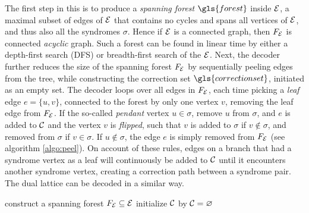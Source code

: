 The first step in this is to produce a \emph{spanning forest} $\gls{forest}$ inside $\mathcal{E}$, a maximal subset of edges of $\mathcal{E}$ that contains no cycles and spans all vertices of $\mathcal{E}$, and thus also all the syndromes $\sigma$. Hence if $\mathcal{E}$ is a connected graph, then $F_{\mathcal{E}}$ is connected \emph{acyclic} graph. Such a forest can be found in linear time by either a depth-first search (DFS) or breadth-first search of the $\mathcal{E}$. Next, the decoder further reduces the size of the spanning forest $F_{\mathcal{E}}$ by sequentially peeling edges from the tree, while constructing the correction set $\gls{correctionset}$, initiated as an empty set. The decoder loops over all edges in $F_{\mathcal{E}}$, each time picking a \emph{leaf} edge $e = \{u,v\}$, connected to the forest by only one vertex $v$, removing the leaf edge from $F_{\mathcal{E}}$. If the so-called \emph{pendant} vertex $u\in\sigma$, remove $u$ from $\sigma$, and $e$ is added to $\mathcal{C}$ and the vertex $v$ is \emph{flipped}, such that $v$ is added to $\sigma$ if $v \notin \sigma$, and removed from $\sigma$ if $v\in\sigma$.  If $u\notin\sigma$, the edge $e$ is simply removed from $F_{\mathcal{E}}$ (see algorithm \ref{algo:peel}). On account of these rules, edges on a branch that had a syndrome vertex as a leaf will continuously be added to $\mathcal{C}$ until it encounters another syndrome vertex, creating a correction path between a syndrome pair. The dual lattice can be decoded in a similar way.
\begin{algo}[algotitle=Peeling decoder (adapted from \cite{delfosse2017linear}), label=algo:peel]
  \begin{algorithm}[H]
    \BlankLine
    construct a spanning forest $F_{\mathcal{E}} \subseteq\mathcal{E}$\;
    initialize $\mathcal{C}$ by $\mathcal{C} = {\varnothing}$\;
  \end{algorithm}
\end{algo}

